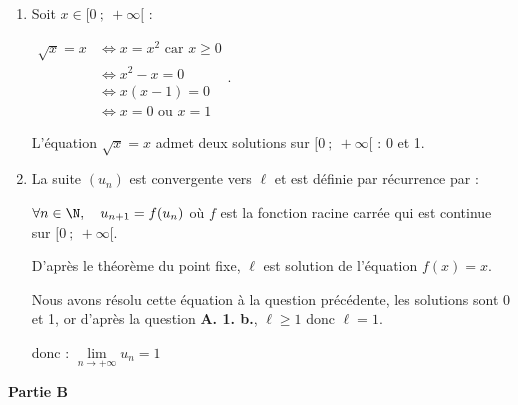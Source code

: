 \begin{enumerate}
\begin{enumerate}
Et pour tout entier $n$, $u_{n+1}\leqslant u_n$ donc la suite $\left( u_n\right)$ est décroissante.

Or toute suite décroissante et minorée est convergente donc, la suite $\left( u_n\right)$ est convergente vers une limite $\ell \geqslant 1$.
	\item Soit $x \in [0~;~+\infty[$ :

$\begin{aligned}\sqrt{x} =x &\iff x =x^2 \text { car }x\geqslant 0 \\
	&\iff x^2-x=0\\
	& \iff x(x-1)=0\\
	&\iff x=0 \text{ ou } x=1
\end{aligned}$.

L'équation $\sqrt{x}=x$ admet deux solutions sur $[0~;~+\infty[$ : 0 et 1.
	\item La suite $\left(u_{n}\right)$ est convergente vers $\ell$ et est définie par récurrence par :

$\forall n \in \N, \quad u_{n+1}=f(u_n)$ \quad où  $f$ est la fonction racine carrée qui est continue sur $[0~;~+\infty[$.

D'après le théorème du point fixe, $\ell$ est solution de l'équation $f(x) = x$.

Nous avons résolu cette équation à la question précédente, les solutions sont 0 et 1, or d'après la question \textbf{A. 1. b.}, $\ell \geqslant 1$ donc $\ell =1$.

donc : $\lim\limits_{n\to +\infty} u_n = 1$
	\end{enumerate}
\end{enumerate}

\medskip

\textbf{Partie B}

\medskip

